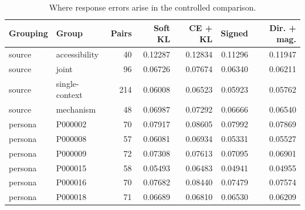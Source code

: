 \begin{table}[pos=htbp]
\centering\footnotesize
\caption{Where response errors arise in the controlled comparison.}
\label{tab:response_breakdown}
\setlength{\tabcolsep}{3pt}
\renewcommand{\arraystretch}{1.12}
\begin{tabular*}{\linewidth}{@{\extracolsep{\fill}}llrrrrr@{}}
\toprule
Grouping & Group & Pairs & Soft KL & CE + KL & Signed & Dir. + mag. \\
\midrule
source & accessibility & 40 & 0.12287 & 0.12834 & 0.11296 & 0.11947 \\
source & joint & 96 & 0.06726 & 0.07674 & 0.06340 & 0.06211 \\
source & single-context & 214 & 0.06008 & 0.06523 & 0.05923 & 0.05762 \\
source & mechanism & 48 & 0.06987 & 0.07292 & 0.06666 & 0.06540 \\
persona & P000002 & 70 & 0.07917 & 0.08605 & 0.07992 & 0.07869 \\
persona & P000008 & 57 & 0.06081 & 0.06934 & 0.05331 & 0.05527 \\
persona & P000009 & 72 & 0.07308 & 0.07613 & 0.07095 & 0.06901 \\
persona & P000015 & 58 & 0.05493 & 0.06483 & 0.04941 & 0.04955 \\
persona & P000016 & 70 & 0.07682 & 0.08440 & 0.07479 & 0.07574 \\
persona & P000018 & 71 & 0.06689 & 0.06810 & 0.06530 & 0.06209 \\
\bottomrule
\end{tabular*}
\par{}
\end{table}

